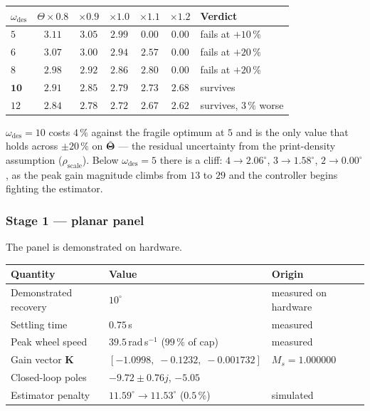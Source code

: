 \begin{center}
\small
{}
\label{tab:qw-robustness}
\begin{tabular}{@{}l|ccccc|l@{}}
\toprule
$\omega_{\mathrm{des}}$ & $\Theta\times0.8$ & $\times0.9$ & $\times1.0$
& $\times1.1$ & $\times1.2$ & Verdict\\
\midrule
$5$ & $3.11$ & $3.05$ & $2.99$ & $0.00$ & $0.00$ & fails at $+10\,\%$\\
$6$ & $3.07$ & $3.00$ & $2.94$ & $2.57$ & $0.00$ & fails at $+20\,\%$\\
$8$ & $2.98$ & $2.92$ & $2.86$ & $2.80$ & $0.00$ & fails at $+20\,\%$\\
$\bm{10}$ & $2.91$ & $2.85$ & $\bm{2.79}$ & $2.73$ & $2.68$ & survives\\
$12$ & $2.84$ & $2.78$ & $2.72$ & $2.67$ & $2.62$ & survives, $3\,\%$ worse\\
\bottomrule
\end{tabular}
\end{center}

$\omega_{\mathrm{des}} = 10$ costs $4\,\%$ against the fragile optimum at $5$
and is the only value that holds across $\pm 20\,\%$ on $\bar{\bm{\Theta}}$
--- the residual uncertainty from the print-density assumption
($\rho_{\mathrm{scale}}$). Below $\omega_{\mathrm{des}} = 5$ there is a
cliff: $4 \to 2.06^\circ$, $3 \to 1.58^\circ$, $2 \to 0.00^\circ$, as the
peak gain magnitude climbs from $13$ to $29$ and the controller begins
fighting the estimator.

\FloatBarrier

\subsubsection{Stage 1 --- planar panel}
\label{sec:panel-results}

The panel is demonstrated on hardware.

\begin{center}
\small
{}
\label{tab:panel-results}
\begin{tabular}{@{}lll@{}}
\toprule
\textbf{Quantity} & \textbf{Value} & \textbf{Origin}\\
\midrule
Demonstrated recovery & $10^\circ$ & measured on hardware\\
Settling time & $0.75$\,s & measured\\
Peak wheel speed & $39.5$\,rad\,s$^{-1}$ ($99\,\%$ of cap) & measured\\
Gain vector $\bm{K}$ & $[-1.0998,\; -0.1232,\; -0.001732]$ & $M_s = 1.000000$\\
Closed-loop poles & $-9.72\pm0.76j$, $-5.05$ & \\
Estimator penalty & $11.59^\circ \to 11.53^\circ$ ($0.5\,\%$) & simulated\\
\bottomrule
\end{tabular}
\end{center}


